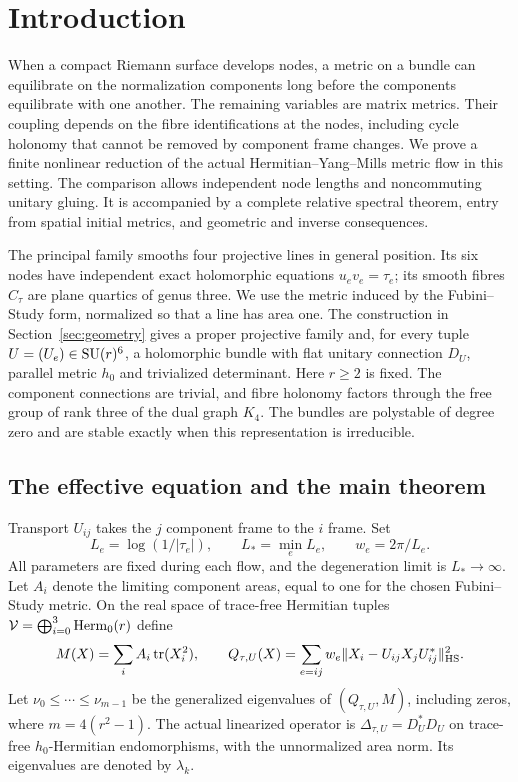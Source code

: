 \section{Introduction}\label{sec:introduction}

When a compact Riemann surface develops nodes, a metric
on a bundle can equilibrate on the normalization components
long before the components equilibrate with one another.
The remaining variables are matrix metrics. Their coupling
depends on the fibre identifications at the nodes, including
cycle holonomy that cannot be removed by component frame
changes. We prove a finite nonlinear reduction of the
actual Hermitian--Yang--Mills metric flow in this setting.
The comparison allows independent node lengths and
noncommuting unitary gluing. It is accompanied by a complete
relative spectral theorem, entry from spatial initial
metrics, and geometric and inverse consequences.

The principal family smooths four projective lines in
general position. Its six nodes have independent exact
holomorphic equations $u_ev_e=\tau_e$; its smooth fibres
$C_\tau$ are plane quartics of genus three. We use the
metric induced by the Fubini--Study form, normalized so
that a line has area one. The construction in
Section~\ref{sec:geometry} gives a proper projective
family and, for every tuple $U=(U_e)\in\operatorname{SU}(r)^6$,
a holomorphic bundle with flat unitary connection $D_U$,
parallel metric $h_0$ and trivialized determinant.
Here $r\ge2$ is fixed. The component connections are
trivial, and fibre holonomy factors through the free
group of rank three of the dual graph $K_4$.
The bundles are polystable of degree zero and are
stable exactly when this representation is irreducible.

\subsection{The effective equation and the main theorem}
Transport $U_{ij}$ takes the $j$ component frame to the
$i$ frame. Set
\[
 L_e=\log(1/|\tau_e|),\qquad L_*=\min_eL_e,\qquad
 w_e=2\pi/L_e .
\]
All parameters are fixed during each flow, and the
degeneration limit is $L_*\to\infty$.
Let $A_i$ denote the limiting component areas, equal
to one for the chosen Fubini--Study metric. On the
real space of trace-free Hermitian tuples
$\mathcal V=\bigoplus_{i=0}^3\operatorname{Herm}_0(r)$ define
\[
 M(X)=\sum_i A_i\operatorname{tr}(X_i^2),\qquad
 Q_{\tau,U}(X)=\sum_{e=ij}w_e
       \|X_i-U_{ij}X_jU_{ij}^*\|_{\mathrm{HS}}^2.
\]
Let $\nu_0\le\cdots\le\nu_{m-1}$ be the generalized
eigenvalues of $(Q_{\tau,U},M)$, including zeros,
where $m=4(r^2-1)$. The actual linearized operator is
$\Delta_{\tau,U}=D_U^*D_U$ on trace-free
$h_0$-Hermitian endomorphisms, with the unnormalized
area norm. Its eigenvalues are denoted by $\lambda_k$.

